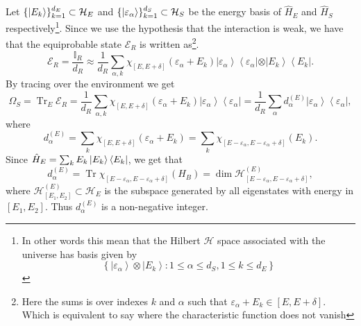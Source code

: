 \indent Let $\{\mathinner{|{E_k}\rangle}\}_{k=1}^{d_E}\subset \mathcal{H}_E$ and $\{\mathinner{|{\varepsilon_\alpha}\rangle}\}_{k=1}^{d_S}\subset \mathcal{H}_S$ be the energy basis of $\hat{H}_E$ and $\hat{H}_S$ respectively\footnote{In other words this mean that the Hilbert $\mathcal{H}$ space associated with the universe has basis given by
\[\left\{\left|\varepsilon_{\alpha}\right\rangle \otimes\left|E_{k}\right\rangle: 1 \leq \alpha \leq d_{S}, 1 \leq k \leq d_{E}\right\}\]}. Since we use the hypothesis that the interaction is weak, we have that the equiprobable state $\mathcal{E}_R$ is written as\footnote{Here the sums is over indexes $k$ and $\alpha$ such that $\varepsilon_{\alpha}+E_{k}\in [E,E+\delta]$. Which is equivalent to say where the characteristic function does not vanish}.
\begin{equation}
\mathcal{E}_{R}=\frac{\mathbb{I}_{R}}{d_{R}} \approx \frac{1}{d_{R}} \sum_{\alpha, k} \chi_{[E, E+\delta]}\left(\varepsilon_{\alpha}+E_{k}\right)\left|\varepsilon_{\alpha}\right\rangle\left\langle\varepsilon_{\alpha}|\otimes| E_{k}\right\rangle\left\langle E_{k}\right|.
\label{CH1:equiprobable_canonical_1}
\end{equation}
\indent By tracing over the environment we get
\begin{equation}
\Omega_{S}=
\operatorname{Tr}_{E} \mathcal{E}_{R}=
\frac{1}{d_{R}} \sum_{\alpha, k} \chi_{[E, E+\delta]}\left(\varepsilon_{\alpha}+E_{k}\right)\left|\varepsilon_{\alpha}\right\rangle\left\langle\varepsilon_{\alpha}\right|=
\frac{1}{d_{R}} \sum_{\alpha} d_{\alpha}^{(E)}\left| \varepsilon_{\alpha}\right\rangle\left\langle\varepsilon_{\alpha}\right|,
\label{CH1:equiprobable_canonical_2}
\end{equation}
where
\begin{equation}
d_{\alpha}^{(E)}=\sum_{k} \chi_{[E, E+\delta]}\left(\varepsilon_{\alpha}+E_{k}\right)=\sum_{k} \chi_{\left[E-\varepsilon_{\alpha}, E-\varepsilon_{\alpha}+\delta\right]}\left(E_{k}\right).
\label{CH1:equiprobable_canonical_3}
\end{equation}
\indent Since $\hat{H}_{E}=\sum_{k} E_k\mathinner{|{E_k}\rangle}\mathinner{\langle{E_k}|}$, we get that
\begin{equation}
d_{\alpha}^{(E)}=\operatorname{Tr} \chi_{\left[E-\varepsilon_{\alpha}, E-\varepsilon_{\alpha}+\delta\right]}\left(H_{B}\right)=\operatorname{dim} \mathcal{H}_{\left[E-\varepsilon_{\alpha}, E-\varepsilon_{\alpha}+\delta\right]}^{(E)},
\label{CH1:equiprobable_canonical_4}
\end{equation}
where $\mathcal{H}^{(E)}_{[E_1,E_2]}\subset \mathcal{H}_{E}$ is the subspace generated by all eigenstates with energy in $[E_1,E_2]$. Thus $d^{(E)}_{\alpha}$ is a non-negative integer.\\

